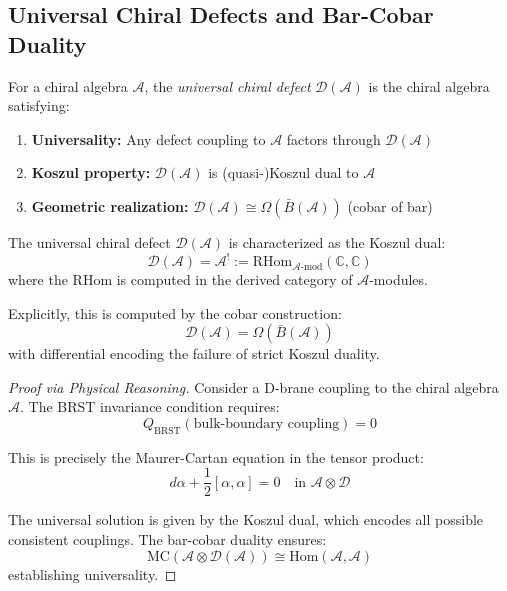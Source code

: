 \subsection{Universal Chiral Defects and Bar-Cobar Duality}

\begin{definition}\label{def:universal-defect}
For a chiral algebra $\mathcal{A}$, the \emph{universal chiral defect} $\mathcal{D}(\mathcal{A})$ is the chiral algebra satisfying:
\begin{enumerate}
\item \textbf{Universality:} Any defect coupling to $\mathcal{A}$ factors through $\mathcal{D}(\mathcal{A})$
\item \textbf{Koszul property:} $\mathcal{D}(\mathcal{A})$ is (quasi-)Koszul dual to $\mathcal{A}$
\item \textbf{Geometric realization:} $\mathcal{D}(\mathcal{A}) \cong \Omega(\bar{B}(\mathcal{A}))$ (cobar of bar)
\end{enumerate}
\end{definition}

\begin{theorem}[Universal Defect = Koszul Dual]\label{thm:defect-koszul}
The universal chiral defect $\mathcal{D}(\mathcal{A})$ is characterized as the Koszul dual:
$$\mathcal{D}(\mathcal{A}) = \mathcal{A}^! := \text{RHom}_{\mathcal{A}\text{-mod}}(\mathbb{C}, \mathbb{C})$$
where the RHom is computed in the derived category of $\mathcal{A}$-modules.

Explicitly, this is computed by the cobar construction:
$$\mathcal{D}(\mathcal{A}) = \Omega(\bar{B}(\mathcal{A}))$$
with differential encoding the failure of strict Koszul duality.
\end{theorem}

\begin{proof}[Proof via Physical Reasoning]
Consider a D-brane coupling to the chiral algebra $\mathcal{A}$. The BRST invariance condition requires:
$$Q_{\text{BRST}}(\text{bulk-boundary coupling}) = 0$$

This is precisely the Maurer-Cartan equation in the tensor product:
$$d\alpha + \frac{1}{2}[\alpha, \alpha] = 0 \quad \text{in } \mathcal{A} \otimes \mathcal{D}$$

The universal solution is given by the Koszul dual, which encodes all possible consistent couplings. The bar-cobar duality ensures:
$$\text{MC}(\mathcal{A} \otimes \mathcal{D}(\mathcal{A})) \cong \text{Hom}(\mathcal{A}, \mathcal{A})$$
establishing universality.
\end{proof}

